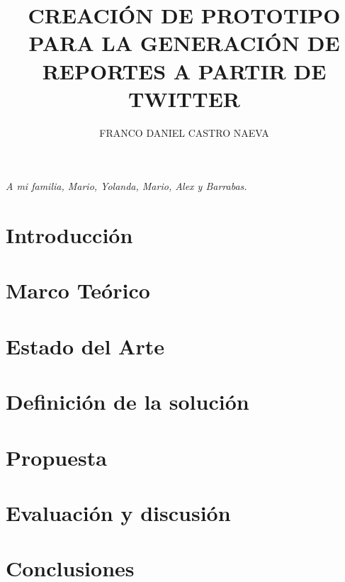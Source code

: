 \documentclass[a4paper, oneside, 11pt]{book}
\author{FRANCO DANIEL CASTRO NAEVA}
\title{CREACIÓN DE PROTOTIPO PARA LA GENERACIÓN DE REPORTES A PARTIR DE TWITTER}
\begin{document}

\frontmatter
	\titlep
\pagestyle{empty}
 

\thispagestyle{empty}
%
	\newpage
	\thispagestyle{empty}
	\null
	\vspace{16cm}
	\hfill
	\textit{A mi familia, Mario, Yolanda, Mario, Alex y Barrabas.}	
	\newpage
	\thispagestyle{empty}
	\tableofcontents
	\thispagestyle{empty}
	\listoffigures
			
	
	
	\listofalgorithms
	
		\mainmatter
		\pagestyle{fancy}
	\chapter{Introducción}
	
		
	\chapter{Marco Teórico}\label{chap:marcoteorico}
	
					
	\chapter{Estado del Arte}\label{chap:estadodelarte}
	
	
	\chapter{Definición de la solución}\label{chap:contexto}
	

	\chapter{Propuesta}\label{chap:propuesta_cap}
	
	
	\chapter{Evaluación y discusión}\label{chap:discusion}
	
	
	\chapter{Conclusiones}\label{chap:conclusiones}
	
\end{document}
